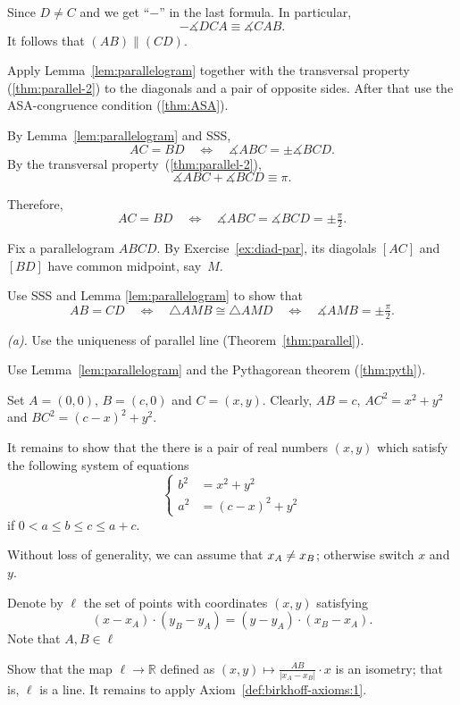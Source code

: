 Since $D\ne C$ and we get ``$-$'' in the last formula.
In particular,
$$-\measuredangle DCA\equiv \measuredangle CAB.$$
It follows that $(AB)\parallel (CD)$.

Apply Lemma~\ref{lem:parallelogram} together with
the transversal property (\ref{thm:parallel-2}) to the diagonals and a pair of opposite sides.
After that use the ASA-congruence condition (\ref{thm:ASA}).

By Lemma~\ref{lem:parallelogram} and SSS, 
\[AC=BD
\quad
\iff
\quad
\measuredangle ABC=\pm \measuredangle BCD.\]
By the transversal property~(\ref{thm:parallel-2}), 
\[\measuredangle ABC+\measuredangle BCD\equiv \pi.\]

Therefore, 
\[AC=BD
\quad
\iff
\quad 
\measuredangle ABC
=\measuredangle BCD
=\pm\tfrac\pi2.\]

Fix a parallelogram $ABCD$.
By Exercise~\ref{ex:diad-par},
its diagolals $[AC]$ and $[BD]$ have common midpoint, say~$M$.

Use SSS and Lemma \ref{lem:parallelogram} to show that
\[AB=CD
\quad
\iff
\quad
\triangle AMB
\cong
\triangle AMD
\quad
\iff
\quad
\measuredangle AMB
=
\pm\tfrac\pi2.\]

 \textit{(a).} Use the uniqueness of parallel line (Theorem~\ref{thm:parallel}).

 Use Lemma~\ref{lem:parallelogram} and the Pythagorean theorem (\ref{thm:pyth}).

Set $A=(0,0)$, $B=(c,0)$ and $C=(x,y)$.
Clearly, $AB=c$,
$AC^2=x^2+y^2$ and $BC^2=(c-x)^2+y^2$.

It remains to show that the there is a pair of real numbers $(x,y)$ 
which satisfy the following system of equations 
$$
\left\{
\begin{aligned}
b^2&=x^2+y^2
\\
a^2&=(c-x)^2+y^2
\end{aligned}
\right.
$$
if $0<a\le b\le c\le a+c$.
\qeds

Without loss of generality, we can assume that $x_A\z\ne x_B$;
otherwise switch $x$ and~$y$.

Denote by $\ell$ the set of points with coordinates $(x,y)$ satisfying
\[(x-x_A)\cdot (y_B-y_A)=(y-y_A)\cdot (x_B-x_A).\]
Note that $A, B\in \ell$

Show that the map $\ell\to \mathbb{R}$ defined as
$(x,y)\mapsto \tfrac{AB}{|x_A-x_B|}\cdot x$ is an isometry;
that is, $\ell$ is a line.
It remains to apply Axiom~\ref{def:birkhoff-axioms:1}.


